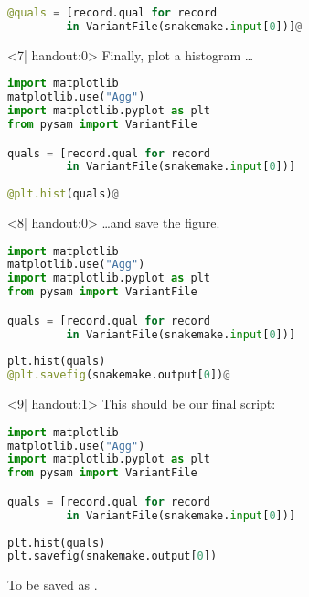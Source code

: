 \begin{frame}[fragile]
\begin{onlyenv}
\begin{lstlisting}[language=Python,style=Python]
@quals = [record.qual for record 
         in VariantFile(snakemake.input[0])]@
   \end{lstlisting}
  \end{onlyenv}
  \begin{onlyenv}<7| handout:0>
   Finally, plot a histogram \ldots
   \begin{lstlisting}[language=Python,style=Python]
import matplotlib
matplotlib.use("Agg")
import matplotlib.pyplot as plt
from pysam import VariantFile

quals = [record.qual for record 
         in VariantFile(snakemake.input[0])]
         
@plt.hist(quals)@
   \end{lstlisting}
  \end{onlyenv}
  \begin{onlyenv}<8| handout:0>
   \ldots and save the figure.
   \begin{lstlisting}[language=Python,style=Python]
import matplotlib
matplotlib.use("Agg")
import matplotlib.pyplot as plt
from pysam import VariantFile

quals = [record.qual for record 
         in VariantFile(snakemake.input[0])]
         
plt.hist(quals)
@plt.savefig(snakemake.output[0])@
   \end{lstlisting}
  \end{onlyenv}
  \begin{onlyenv}<9| handout:1>
   This should be our final script:
   \begin{lstlisting}[language=Python,style=Python]
import matplotlib
matplotlib.use("Agg")
import matplotlib.pyplot as plt
from pysam import VariantFile

quals = [record.qual for record 
         in VariantFile(snakemake.input[0])]
         
plt.hist(quals)
plt.savefig(snakemake.output[0])
   \end{lstlisting}
  To be saved as .
  \end{onlyenv}
\end{frame}





